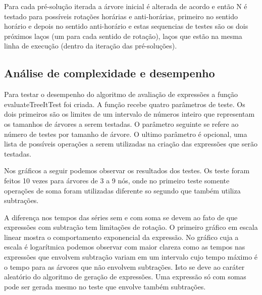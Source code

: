 Para cada pré-solução iterada a árvore inicial é alterada de acordo e então N é testado para possíveis rotações horárias e anti-horárias, primeiro no sentido horário e depois no sentido anti-horário e estas sequencias de testes são os dois próximos laços (um para cada sentido de rotação), laços que estão na mesma linha de execução (dentro da iteração das pré-soluções).

	
	

\subsection{Análise de complexidade e desempenho}
Para testar o desempenho do algoritmo de avaliação de expressões a função evaluateTreeItTest foi criada. A função recebe quatro parâmetros de teste. Os dois primeiros são os limites de um intervalo de números inteiro que representam os tamanhos de árvores a serem testadas. O parâmetro seguinte se refere ao número de testes por tamanho de árvore. O ultimo parâmetro é opcional, uma lista de possíveis operações a serem utilizadas na criação das expressões que serão testadas.

	Nos gráficos a seguir podemos observar os resultados dos testes. Os teste foram feitos 10 vezes para árvores de 3 a 9 nós, onde no primeiro teste somente operações de soma foram utilizadas diferente so segundo que também utiliza subtrações.

A diferença nos tempos das séries sem e com soma se devem ao fato de que expressões com subtração tem limitações de rotação. O primeiro gráfico em escala linear mostra o comportamento exponencial da expressão. No gráfico cuja a escala é logarítmica podemos observar com maior clareza como as tempos nas expressões que envolvem subtração variam em um intervalo cujo tempo máximo é o tempo para as árvores que não envolvem subtrações. Isto se deve ao caráter aleatório do algoritmo de geração de expressões. Uma expressão só com somas pode ser gerada mesmo no teste que envolve também subtrações.
